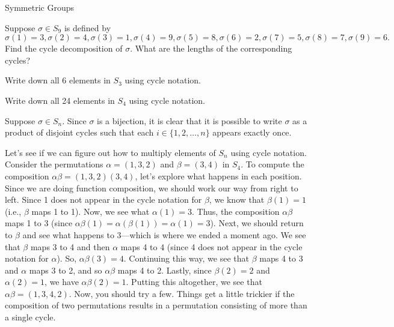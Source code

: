 \begin{section}{Symmetric Groups}
\begin{problem}
Suppose $\sigma\in S_{9}$ is defined by
\[
\sigma(1)=3, \sigma(2)=4, \sigma(3)=1, \sigma(4)=9, \sigma(5)=8, \sigma(6)=2, \sigma(7)=5, \sigma(8)=7, \sigma(9)=6.
\]
Find the cycle decomposition of $\sigma$. What are the lengths of the corresponding cycles?
\end{problem}

\begin{problem}\label{prob:S3-2}
Write down all 6 elements in $S_3$ using cycle notation.
\end{problem}

\begin{problem}\label{prob:S4}
Write down all 24 elements in $S_4$ using cycle notation.
\end{problem}

Suppose $\sigma\in S_n$.  Since $\sigma$ is a bijection, it is clear that it is possible to write $\sigma$ as a product of disjoint cycles such that each $i\in\{1,2,\ldots, n\}$ appears exactly once.

Let's see if we can figure out how to multiply elements of $S_n$ using cycle notation.  Consider the permutations $\alpha=(1,3,2)$ and $\beta=(3,4)$ in $S_4$.  To compute the composition $\alpha\beta=(1,3,2)(3,4)$, let's explore what happens in each position.  Since we are doing function composition, we should work our way from right to left.  Since 1 does not appear in the cycle notation for $\beta$, we know that $\beta(1)=1$ (i.e., $\beta$ maps 1 to 1).  Now, we see what $\alpha(1)=3$.  Thus, the composition $\alpha\beta$ maps 1 to 3 (since $\alpha\beta(1)=\alpha(\beta(1))=\alpha(1)=3$).  Next, we should return to $\beta$ and see what happens to 3---which is where we ended a moment ago.  We see that $\beta$ maps 3 to 4 and then $\alpha$ maps 4 to 4 (since 4 does not appear in the cycle notation for $\alpha$).  So, $\alpha\beta(3)=4$.  Continuing this way, we see that $\beta$ maps 4 to 3 and $\alpha$ maps 3 to 2, and so $\alpha\beta$ maps 4 to 2.  Lastly, since $\beta(2)=2$ and $\alpha(2)=1$, we have $\alpha\beta(2)=1$.  Putting this altogether, we see that $\alpha\beta=(1,3,4,2)$.  Now, you should try a few.  Things get a little trickier if the composition of two permutations results in a permutation consisting of more than a single cycle.


\end{section}
